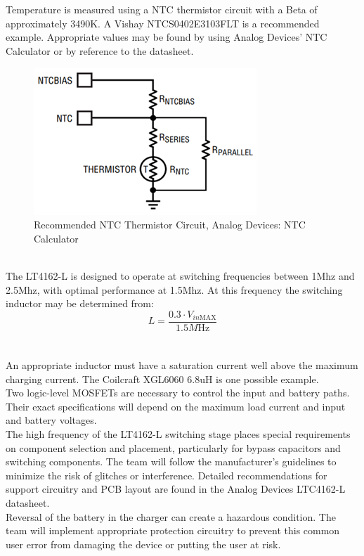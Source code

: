 \documentclass[12pt]{article}
\begin{document}
\hfill \\
\pagebreak
\hfill \\
\indent
Temperature is measured using a NTC thermistor circuit with a Beta of approximately 3490K. A Vishay NTCS0402E3103FLT is a recommended example. Appropriate values may be found by using Analog Devices’ NTC Calculator or by reference to the datasheet.
\begin{figure}[h!]
\centering
\includegraphics[width=0.4\linewidth]{rec_therm}
\caption{Recommended NTC Thermistor Circuit, Analog Devices: NTC Calculator}
\end{figure}
\hfill \\
\indent
The LT4162-L is designed to operate at switching frequencies between 1Mhz and 2.5Mhz, with optimal performance at 1.5Mhz. At this frequency the switching inductor may be determined from:
\begin{equation}
L = \frac{0.3\cdot V_{in\mathrm{ MAX}}}{1.5M\mathrm{Hz}}
\end{equation}
\hfill \\
\pagebreak
\hfill \\
\indent \indent
An appropriate inductor must have a saturation current well above the maximum charging current. The Coilcraft XGL6060 6.8uH is one possible example.\\

\indent
Two logic-level MOSFETs are necessary to control the input and battery paths. Their exact specifications will depend on the maximum load current and input and battery voltages.\\

\indent
The high frequency of the LT4162-L switching stage places special requirements on component selection and placement, particularly for bypass capacitors and switching components. The team will follow the manufacturer’s guidelines to minimize the risk of glitches or interference. Detailed recommendations for support circuitry and PCB layout are found in the Analog Devices LTC4162-L datasheet.\\

\indent
Reversal of the battery in the charger can create a hazardous condition. The team will implement appropriate protection circuitry to prevent this common user error from damaging the device or putting the user at risk. \cite{appNote171}
\end{document}
